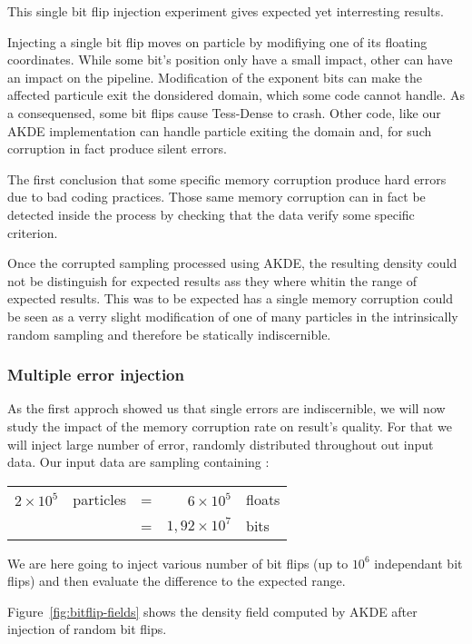 \documentclass[10pt,a4paper,twoside,twocolumn]{article}
\begin{document}
This single bit flip injection experiment gives expected yet interresting
results.

Injecting a single bit flip moves on particle by modifiying one of its floating
coordinates. While some bit's position only have a small impact, other can have
an impact on the pipeline. Modification of the exponent bits can make the
affected particule exit the donsidered domain, which some code cannot handle.
As a consequensed, some bit flips cause Tess-Dense to crash. Other code, like
our AKDE implementation can handle particle exiting the domain and, for such
corruption in fact produce silent errors.

The first conclusion that some specific memory corruption produce hard errors
due to bad coding practices. Those same memory corruption can in fact be
detected inside the process by checking that the data verify some specific
criterion.

Once the corrupted sampling processed using AKDE, the resulting density could
not be distinguish for expected results ass they where whitin the range of
expected results. This was to be expected has a single memory corruption could
be seen as a verry slight modification of one of many particles in the
intrinsically random sampling and therefore be statically indiscernible.

\subsubsection{Multiple error injection}

As the first approch showed us that single errors are indiscernible, we will now
study the impact of the memory corruption rate on result's quality. For that we
will inject large number of error, randomly distributed throughout out input
data. Our input data are sampling containing :
\begin{table}[h]
	\centering
	\begin{tabular}{rlcrl}
		$2\times10^5$	& particles	&=	& $6\times10^5$			& floats	\\
									&						&= 	& $1,92\times10^7$	& bits
	\end{tabular}
\end{table}
We are here going to inject various number of bit flips (up to $10^6$
independant bit flips) and then evaluate the difference to the expected range.

Figure~\ref{fig:bitflip-fields} shows the density field computed by AKDE after
injection of random bit flips.
\end{document}
